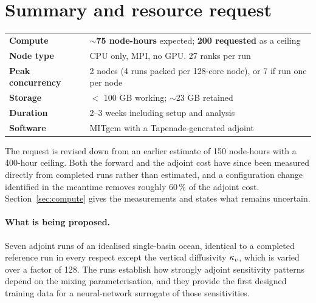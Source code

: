 \section*{Summary and resource request}

\begin{center}
\begin{tabularx}{\textwidth}{@{}lL@{}}
\toprule
\textbf{Compute} & \textbf{$\sim$75 node-hours} expected;
  \textbf{200 requested} as a ceiling\\
\textbf{Node type} & CPU only, MPI, no GPU. 27 ranks per run\\
\textbf{Peak concurrency} & 2 nodes (4 runs packed per 128-core node), or 7 if
  run one per node\\
\textbf{Storage} & $<$ 100 GB working; $\sim$23 GB retained\\
\textbf{Duration} & 2--3 weeks including setup and analysis\\
\textbf{Software} & MITgcm with a Tapenade-generated adjoint\\
\bottomrule
\end{tabularx}
\end{center}

The request is revised down from an earlier estimate of 150 node-hours with a
400-hour ceiling. Both the forward and the adjoint cost have since been measured
directly from completed runs rather than estimated, and a configuration change
identified in the meantime removes roughly 60\,\% of the adjoint cost.
Section~\ref{sec:compute} gives the measurements and states what remains
uncertain.

\paragraph{What is being proposed.}
Seven adjoint runs of an idealised single-basin ocean, identical to a completed
reference run in every respect except the vertical diffusivity $\kappa_{v}$, which is
varied over a factor of 128. The runs establish how strongly adjoint sensitivity
patterns depend on the mixing parameterisation, and they provide the first
designed training data for a neural-network surrogate of those sensitivities.

